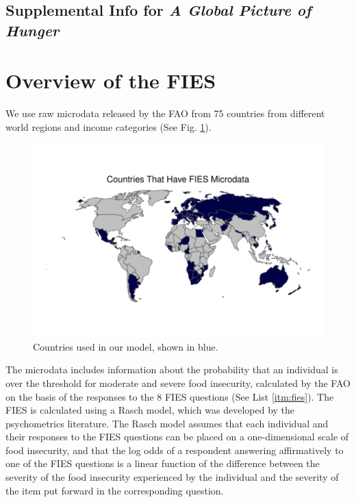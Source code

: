 \documentclass{article}
\begin{document}
\begin{center}
\section*{Supplemental Info for \textit{A Global Picture of Hunger}}
\end{center}
\setcounter{table}{0}
\setcounter{figure}{0}
\setcounter{section}{0}
\renewcommand{\thetable}{S\arabic{table}}
\renewcommand{\thefigure}{S\arabic{figure}}
\renewcommand{\thesection}{S\arabic{section}}

\section{Overview of the FIES}
We use raw microdata released by the FAO from 75 countries from different world regions and income categories (See Fig. \ref{fig:fies_countries}).

\begin{figure}[H]
  \centering
  \includegraphics[width=\linewidth]{img/FIES_Countries.pdf}
  \caption{Countries used in our model, shown in blue.}
  \label{fig:fies_countries}
\end{figure}

The microdata includes information about the probability that an individual is over the threshold for moderate and severe food insecurity, calculated by the FAO on the basis of the responses to the 8 FIES questions (See List \ref{itm:fies}).  The FIES is calculated using a Rasch model, which was developed by the psychometrics literature.  The Rasch model assumes that each individual and their responses to the FIES questions can be placed on a one-dimensional scale of food insecurity, and that the log odds of a respondent answering affirmatively to one of the FIES questions is a linear function of the difference between the severity of the food insecurity experienced by the individual and the severity of the item put forward in the corresponding question.
\end{document}
